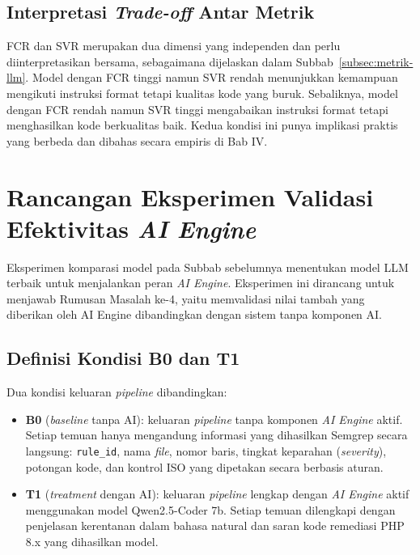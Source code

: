 \subsection{Interpretasi \textit{Trade-off} Antar Metrik}

FCR dan SVR merupakan dua dimensi yang independen dan perlu
diinterpretasikan bersama, sebagaimana dijelaskan dalam
Subbab~\ref{subsec:metrik-llm}. Model dengan FCR tinggi namun SVR
rendah menunjukkan kemampuan mengikuti instruksi format tetapi
kualitas kode yang buruk. Sebaliknya, model dengan FCR rendah namun
SVR tinggi mengabaikan instruksi format tetapi menghasilkan kode
berkualitas baik. Kedua kondisi ini punya implikasi praktis yang
berbeda dan dibahas secara empiris di Bab IV.
\section{Rancangan Eksperimen Validasi Efektivitas \textit{AI Engine}}
\label{sec:eksperimen-b0t1}

Eksperimen komparasi model pada Subbab sebelumnya menentukan model LLM 
terbaik untuk menjalankan peran \textit{AI Engine}. Eksperimen ini dirancang untuk menjawab Rumusan Masalah ke-4, yaitu memvalidasi nilai tambah yang diberikan oleh AI Engine dibandingkan dengan sistem tanpa komponen AI.

\subsection{Definisi Kondisi B0 dan T1}

Dua kondisi keluaran \textit{pipeline} dibandingkan:

\begin{itemize}
    \item \textbf{B0} (\textit{baseline} tanpa AI): keluaran 
    \textit{pipeline} tanpa komponen \textit{AI Engine} aktif. Setiap 
    temuan hanya mengandung informasi yang dihasilkan Semgrep secara 
    langsung: \texttt{rule\_id}, nama \textit{file}, nomor baris, 
    tingkat keparahan (\textit{severity}), potongan kode, dan kontrol 
    ISO yang dipetakan secara berbasis aturan.
    \item \textbf{T1} (\textit{treatment} dengan AI): keluaran 
    \textit{pipeline} lengkap dengan \textit{AI Engine} aktif 
    menggunakan model Qwen2.5-Coder 7b. Setiap temuan dilengkapi 
    dengan penjelasan kerentanan dalam bahasa natural dan saran kode 
    remediasi PHP 8.x yang dihasilkan model.
\end{itemize}

